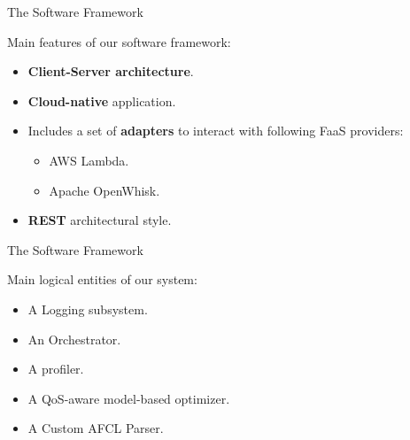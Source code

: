 \documentclass[13.5pt]{beamer}
\newcommand{\B}[1]{\textcolor{TorVergataColor}{\textbf{#1}}}
\begin{document}

\begin{frame}{The Software Framework}
	
 	Main features of our software framework:
	\vspace{\baselineskip}
	\begin{itemize}
		\item \B{Client-Server architecture}.
		\item \B{Cloud-native} application.
		\item Includes a set of \B{adapters} to interact with following FaaS providers:
		\begin{itemize}
			\item AWS Lambda.
			\item Apache OpenWhisk.
		\end{itemize}
		\item \B{REST} architectural style.
	\end{itemize}
	
\end{frame} 
\begin{frame}{The Software Framework}
	
	Main logical entities of our system:
	
	\begin{itemize}
		\item A Logging subsystem.
		\item An Orchestrator.
		\item A profiler.
		\item A QoS-aware model-based optimizer.
		\item A Custom AFCL Parser.
	\end{itemize}
	
\end{frame} 
\end{document}
